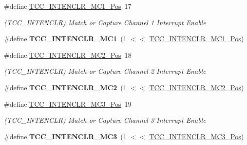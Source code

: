 \begin{DoxyCompactItemize}
\item 
\hypertarget{group___s_a_m_l21___t_c_c_ga148e2c10da8c806a5f8d3542f18d747e}{}\#define \hyperlink{group___s_a_m_l21___t_c_c_ga148e2c10da8c806a5f8d3542f18d747e}{T\+C\+C\+\_\+\+I\+N\+T\+E\+N\+C\+L\+R\+\_\+\+M\+C1\+\_\+\+Pos}~17\label{group___s_a_m_l21___t_c_c_ga148e2c10da8c806a5f8d3542f18d747e}

\begin{DoxyCompactList}\small\item\em (T\+C\+C\+\_\+\+I\+N\+T\+E\+N\+C\+L\+R) Match or Capture Channel 1 Interrupt Enable \end{DoxyCompactList}\item 
\hypertarget{group___s_a_m_l21___t_c_c_gac0ecd2e4a795474c1d44e7560e2e81bb}{}\#define {\bfseries T\+C\+C\+\_\+\+I\+N\+T\+E\+N\+C\+L\+R\+\_\+\+M\+C1}~(1 $<$$<$ \hyperlink{group___s_a_m_l21___t_c_c_ga148e2c10da8c806a5f8d3542f18d747e}{T\+C\+C\+\_\+\+I\+N\+T\+E\+N\+C\+L\+R\+\_\+\+M\+C1\+\_\+\+Pos})\label{group___s_a_m_l21___t_c_c_gac0ecd2e4a795474c1d44e7560e2e81bb}

\item 
\hypertarget{group___s_a_m_l21___t_c_c_ga9c9e431a6e26994a67a6b424b9ff7cbd}{}\#define \hyperlink{group___s_a_m_l21___t_c_c_ga9c9e431a6e26994a67a6b424b9ff7cbd}{T\+C\+C\+\_\+\+I\+N\+T\+E\+N\+C\+L\+R\+\_\+\+M\+C2\+\_\+\+Pos}~18\label{group___s_a_m_l21___t_c_c_ga9c9e431a6e26994a67a6b424b9ff7cbd}

\begin{DoxyCompactList}\small\item\em (T\+C\+C\+\_\+\+I\+N\+T\+E\+N\+C\+L\+R) Match or Capture Channel 2 Interrupt Enable \end{DoxyCompactList}\item 
\hypertarget{group___s_a_m_l21___t_c_c_ga46cba8ed023e997fbb7c355a1541bea2}{}\#define {\bfseries T\+C\+C\+\_\+\+I\+N\+T\+E\+N\+C\+L\+R\+\_\+\+M\+C2}~(1 $<$$<$ \hyperlink{group___s_a_m_l21___t_c_c_ga9c9e431a6e26994a67a6b424b9ff7cbd}{T\+C\+C\+\_\+\+I\+N\+T\+E\+N\+C\+L\+R\+\_\+\+M\+C2\+\_\+\+Pos})\label{group___s_a_m_l21___t_c_c_ga46cba8ed023e997fbb7c355a1541bea2}

\item 
\hypertarget{group___s_a_m_l21___t_c_c_gaa3965b6fb10f99d772d55b9f4372bf9c}{}\#define \hyperlink{group___s_a_m_l21___t_c_c_gaa3965b6fb10f99d772d55b9f4372bf9c}{T\+C\+C\+\_\+\+I\+N\+T\+E\+N\+C\+L\+R\+\_\+\+M\+C3\+\_\+\+Pos}~19\label{group___s_a_m_l21___t_c_c_gaa3965b6fb10f99d772d55b9f4372bf9c}

\begin{DoxyCompactList}\small\item\em (T\+C\+C\+\_\+\+I\+N\+T\+E\+N\+C\+L\+R) Match or Capture Channel 3 Interrupt Enable \end{DoxyCompactList}\item 
\hypertarget{group___s_a_m_l21___t_c_c_ga386f4da64c981efb40fd4937340639e9}{}\#define {\bfseries T\+C\+C\+\_\+\+I\+N\+T\+E\+N\+C\+L\+R\+\_\+\+M\+C3}~(1 $<$$<$ \hyperlink{group___s_a_m_l21___t_c_c_gaa3965b6fb10f99d772d55b9f4372bf9c}{T\+C\+C\+\_\+\+I\+N\+T\+E\+N\+C\+L\+R\+\_\+\+M\+C3\+\_\+\+Pos})\label{group___s_a_m_l21___t_c_c_ga386f4da64c981efb40fd4937340639e9}


\end{DoxyCompactItemize}
